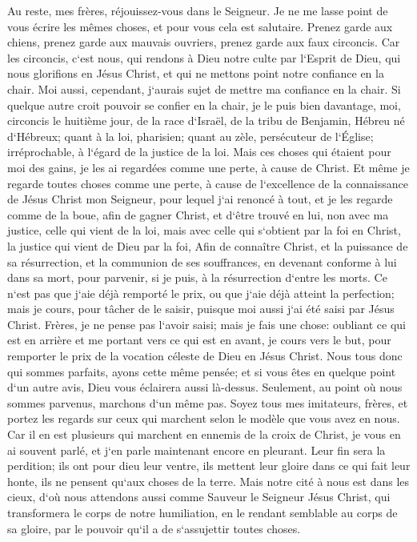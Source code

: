 \verse Au reste, mes frères, réjouissez-vous dans le Seigneur. Je ne me lasse point de vous écrire les mêmes choses, et pour vous cela est salutaire. 
\verse Prenez garde aux chiens, prenez garde aux mauvais ouvriers, prenez garde aux faux circoncis. 
\verse Car les circoncis, c`est nous, qui rendons à Dieu notre culte par l`Esprit de Dieu, qui nous glorifions en Jésus Christ, et qui ne mettons point notre confiance en la chair. 
\verse Moi aussi, cependant, j`aurais sujet de mettre ma confiance en la chair. Si quelque autre croit pouvoir se confier en la chair, je le puis bien davantage, 
\verse moi, circoncis le huitième jour, de la race d`Israël, de la tribu de Benjamin, Hébreu né d`Hébreux; quant à la loi, pharisien; 
\verse quant au zèle, persécuteur de l`Église; irréprochable, à l`égard de la justice de la loi. 
\verse Mais ces choses qui étaient pour moi des gains, je les ai regardées comme une perte, à cause de Christ. 
\verse Et même je regarde toutes choses comme une perte, à cause de l`excellence de la connaissance de Jésus Christ mon Seigneur, pour lequel j`ai renoncé à tout, et je les regarde comme de la boue, afin de gagner Christ, 
\verse et d`être trouvé en lui, non avec ma justice, celle qui vient de la loi, mais avec celle qui s`obtient par la foi en Christ, la justice qui vient de Dieu par la foi, 
\verse Afin de connaître Christ, et la puissance de sa résurrection, et la communion de ses souffrances, en devenant conforme à lui dans sa mort, pour parvenir, 
\verse si je puis, à la résurrection d`entre les morts. 
\verse Ce n`est pas que j`aie déjà remporté le prix, ou que j`aie déjà atteint la perfection; mais je cours, pour tâcher de le saisir, puisque moi aussi j`ai été saisi par Jésus Christ. 
\verse Frères, je ne pense pas l`avoir saisi; mais je fais une chose: oubliant ce qui est en arrière et me portant vers ce qui est en avant, 
\verse je cours vers le but, pour remporter le prix de la vocation céleste de Dieu en Jésus Christ. 
\verse Nous tous donc qui sommes parfaits, ayons cette même pensée; et si vous êtes en quelque point d`un autre avis, Dieu vous éclairera aussi là-dessus. 
\verse Seulement, au point où nous sommes parvenus, marchons d`un même pas. 
\verse Soyez tous mes imitateurs, frères, et portez les regards sur ceux qui marchent selon le modèle que vous avez en nous. 
\verse Car il en est plusieurs qui marchent en ennemis de la croix de Christ, je vous en ai souvent parlé, et j`en parle maintenant encore en pleurant. 
\verse Leur fin sera la perdition; ils ont pour dieu leur ventre, ils mettent leur gloire dans ce qui fait leur honte, ils ne pensent qu`aux choses de la terre. 
\verse Mais notre cité à nous est dans les cieux, d`où nous attendons aussi comme Sauveur le Seigneur Jésus Christ, 
\verse qui transformera le corps de notre humiliation, en le rendant semblable au corps de sa gloire, par le pouvoir qu`il a de s`assujettir toutes choses. 


